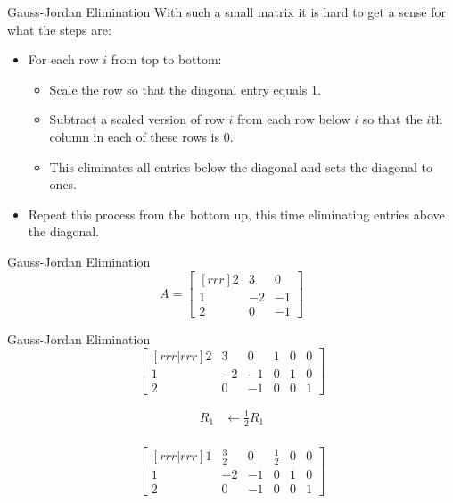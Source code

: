 \documentclass[serif,xcolor=pdftex,dvipsnames,table,hyperref={bookmarks=false,breaklinks}]{beamer}
\begin{document}
\begin{frame}[t]{Gauss-Jordan Elimination}
	With such a small matrix it is hard to get a sense for what the steps are:
	\pause
	\begin{itemize}[<+->]
		\item For each row $i$ from top to bottom:
		\begin{itemize}[<+->]
			\item Scale the row so that the diagonal entry equals 1.
			\item Subtract a scaled version of row $i$ from each row below $i$ so that the $i$th column in each of these rows is $0$.
			\item This eliminates all entries below the diagonal and sets the diagonal to ones.
		\end{itemize}
		\item Repeat this process from the bottom up, this time eliminating entries above the diagonal.
	\end{itemize}
\end{frame}

\begin{frame}[t]{Gauss-Jordan Elimination}
	$$A = \begin{bmatrix}[rrr]
    	2 & 3 & 0\\
		1 & -2 & -1\\
		2 & 0 & -1
	\end{bmatrix}$$
	
\end{frame}

\begin{frame}[t]{Gauss-Jordan Elimination}
	$$\begin{bmatrix}[rrr|rrr]
    	2 & 3 & 0 & 1 & 0 & 0\\
		1 & -2 & -1 & 0 & 1 & 0\\
		2 & 0 & -1 & 0 & 0 & 1
	\end{bmatrix}$$
	
	\pause
	\begin{align*}
		R_1 &\leftarrow \frac{1}{2}R_1\\
	\end{align*}
	
	\pause
	$$\begin{bmatrix}[rrr|rrr]
    	1 & \frac{3}{2} & 0 & \frac{1}{2} & 0 & 0\\
		1 & -2 & -1 & 0 & 1 & 0\\
		2 & 0 & -1 & 0 & 0 & 1
	\end{bmatrix}$$
	
\end{frame}
\end{document}
